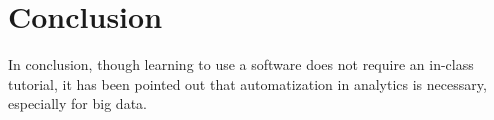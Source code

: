 \section{Conclusion}
In conclusion, though learning to use a software does not require an in-class tutorial, it has been pointed out that automatization in analytics is necessary, especially for big data.

